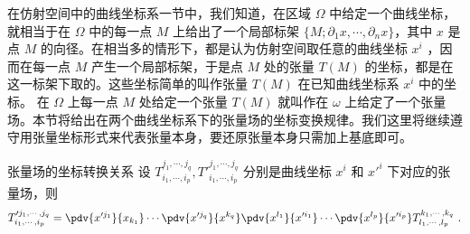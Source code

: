 
在仿射空间中的曲线坐标系一节中，我们知道，在区域 $\Omega$ 中给定一个曲线坐标，就相当于在 $\Omega$ 中的每一点 $M$ 上给出了一个局部标架 $\{M;\partial_1 x,\cdots,\partial_n x\}$，其中 $x$ 是点 $M$ 的向径。在相当多的情形下，都是认为仿射空间取任意的曲线坐标 $x^i$ ，因而在每一点 $M$ 产生一个局部标架，于是点 $M$ 处的张量 $T(M)$ 的坐标，都是在这一标架下取的。这些坐标简单的叫作张量 $T(M)$ 在已知曲线坐标系 $x^i$ 中的坐标。 在 $\Omega$ 上每一点 $M$ 处给定一个张量 $T(M)$ 就叫作在 $\omega$ 上给定了一个张量场。本节将给出在两个曲线坐标系下的张量场的坐标变换规律。我们这里将继续遵守用张量坐标形式来代表张量本身，要还原张量本身只需加上基底即可。

\begin{theorem}{张量场的坐标转换关系}
设 $T^{j_1,\cdots,j_q}_{i_1,\cdots,i_p},T'^{j_1,\cdots,j_q}_{i_1,\cdots,i_p}$ 分别是曲线坐标 $x^i$ 和 $x'^i$ 下对应的张量场，则
\begin{equation}
T'^{j_1,\cdots,j_q}_{i_1,\cdots,i_p}=\pdv{x'^{j_1}}{x_{k_1}}\cdots \pdv{x'^{j_q}}{x^{k_q}}\pdv{x^{l_1}}{x'^{i_1}}\cdots \pdv{x^{l_p}}{x'^{i_p}}T^{k_1,\cdots,k_q}_{l_1,\cdots,l_p}~.
\end{equation}
 
\end{theorem}
